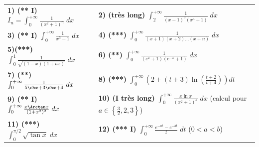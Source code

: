 {{\begin{center}
\begin{tabular}{ll}
\textbf{1) (** I)} $I_n=\int_{0}^{+\infty}\frac{1}{(x^2+1)^n}\;dx$&\textbf{2) (très long)} $\int_{2}^{+\infty}\frac{1}{(x-1)^3(x^4+1)}\;dx$\\
\textbf{3) (** I)} $\int_{0}^{+\infty}\frac{1}{x^3+1}\;dx$&
\textbf{4) (***)} $\int_{0}^{+\infty}\frac{1}{(x+1)(x+2)\ldots(x+n)}\;dx$\\
\rule[-6mm]{0mm}{14mm}\textbf{5)(***)} $\int_{0}^{1}\frac{1}{\sqrt{(1-x)(1+ax)}}\;dx$&\textbf{6) (**)} $\int_{0}^{+\infty}\frac{1}{(e^x+1)(e^{-x}+1)}\;dx$\\
\rule[-6mm]{0mm}{0mm}\textbf{7) (**)} $\int_{0}^{+\infty}\frac{1}{5\ch x+3\sh x+4}\;dx$&\textbf{8) (***)} $\int_{0}^{+\infty}\left(2+(t+3)\ln\left(\frac{t+2}{t+4}\right)\right)dt$\\
\textbf{9) (** I)} $\int_{0}^{+\infty}\frac{x\Arctan x}{(1+x^2)^2}\;dx$&
\rule[-6mm]{0mm}{0mm}\textbf{10) (I très long)} $\int_{0}^{+\infty}\frac{x\ln x}{(x^2+1)^a}\;dx$ (calcul pour $a\in\left\{\frac{3}{2},2,3\right\}$)\\
\rule[-7mm]{0mm}{0mm}\textbf{11) (***)} $\int_{0}^{\pi/2}\sqrt{\tan x}\;dx$&\textbf{12) (*** I)} $\int_{0}^{+\infty}\frac{e^{-at}-e^{-bt}}{t}\;dt$ ($0 < a < b$)
\end{tabular}
\end{center}
}
}
